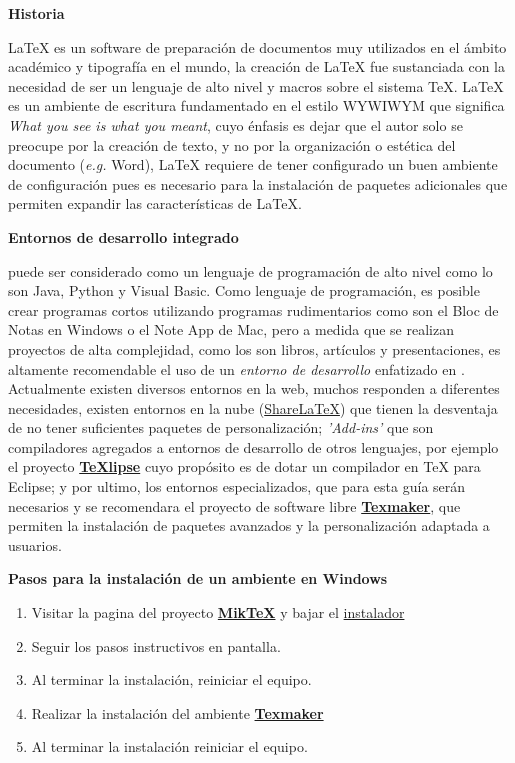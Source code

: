 \textbf{Historia}

 \LaTeX{} es un software de preparación de documentos muy utilizados en el ámbito académico y tipografía en el mundo, la creación de \LaTeX{} fue sustanciada con la necesidad de ser un lenguaje de alto nivel y macros sobre el sistema \TeX{}. \LaTeX{}  es un ambiente de escritura fundamentado en el estilo WYWIWYM que significa \emph{What you see is what you meant}, cuyo énfasis es dejar que el autor solo se preocupe por la creación de texto, y no por la organización o estética del documento (\emph{e.g.} Word), \LaTeX{} requiere de tener configurado un buen ambiente de configuración pues es necesario para la instalación de paquetes adicionales que permiten expandir las características de \LaTeX{}. 
 
 \textbf{Entornos de desarrollo integrado}
 
\LaTeXe{}   puede ser considerado como un lenguaje de programación de alto nivel como lo son Java, Python y Visual Basic. Como lenguaje de programación, es posible crear programas cortos utilizando programas rudimentarios como son el Bloc de Notas en Windows o el Note App de Mac, pero a medida que se realizan proyectos de alta complejidad, como los son libros, artículos y presentaciones, es altamente recomendable el uso de un \emph{entorno de desarrollo } enfatizado en \LaTeXe{}. Actualmente existen diversos entornos en la web, muchos responden a diferentes necesidades, existen entornos en la nube (\href{https://www.sharelatex.com}{ShareLaTeX}) que tienen la desventaja de no tener suficientes paquetes de personalización; \emph{'Add-ins'} que son compiladores agregados a entornos de desarrollo de otros lenguajes, por ejemplo el proyecto \href{texlipse.sourceforge.net}{\textbf{TeXlipse}} cuyo propósito es de dotar un compilador en \TeX{} para Eclipse; y por ultimo, los entornos especializados, que para esta guía serán necesarios y se recomendara el proyecto de software libre \href{www.xm1math.net/texmaker/}{\textbf{Texmaker}}, que permiten la instalación de paquetes avanzados y la personalización adaptada a usuarios.

\textbf{Pasos para la instalación de un ambiente en Windows}

\begin{enumerate}
	\item Visitar la pagina del proyecto \href{http://miktex.org/download}{ \textbf{ Mik\TeX{}}} y bajar el    \href{http://mirrors.ctan.org/systems/win32/miktex/setup/basic-miktex-2.9.5105.exe}{instalador}	
	\item Seguir los pasos instructivos en pantalla.
	\item Al terminar la instalación, reiniciar el equipo.
	\item  Realizar la instalación del ambiente \href{www.xm1math.net/texmaker/}{\textbf{Texmaker}}
	\item Al terminar la instalación reiniciar el equipo.
\end{enumerate}


